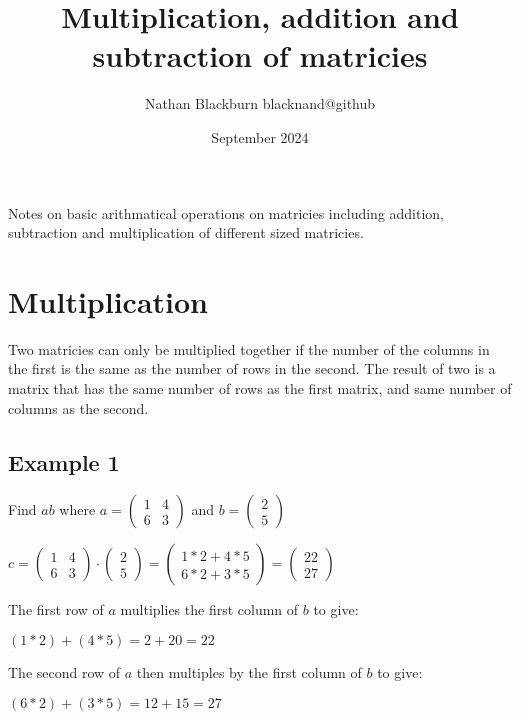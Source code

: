 \documentclass[options]{article}
\title{Multiplication, addition and subtraction of matricies}
\author{Nathan Blackburn {blacknand@github}}
\date{September 2024}
\begin{document}
\maketitle
Notes on basic arithmatical operations on matricies including addition, subtraction and multiplication of different sized matricies.
\section{Multiplication}
Two matricies can only be multiplied together if the number of the columns in the first is the same as the number of rows in the second. The
result of two is a matrix that has the same number of rows as the first matrix, and same number of columns as the second.
\subsection{Example 1}
Find \(ab\) where \(a = \begin{pmatrix} 1 & 4\\6 & 3 \end{pmatrix}\) and \(b = \begin{pmatrix} 2 \\ 5 \end{pmatrix}\)
\begin{center}
    \( 
        c =
        \begin{pmatrix}
            1 & 4 \\ 6 & 3
        \end{pmatrix} 
        \cdot
        \begin{pmatrix}
            2 \\ 5
        \end{pmatrix}
        =
        \begin{pmatrix}
            1 * 2 + 4 * 5\\
            6 * 2 + 3 * 5
        \end{pmatrix}
        =
        \begin{pmatrix}
            22 \\ 27
        \end{pmatrix}
    \)
\end{center}
The first row of \(a\) multiplies the first column of \(b\) to give:
\begin{center}
    \(
        (1 * 2) + (4 * 5) = 2 + 20 = 22
    \)
\end{center}
The second row of \(a\) then multiples by the first column of \(b\) to give:
\begin{center}
    \(
        (6 * 2) + (3 * 5) = 12 + 15 = 27
    \)
\end{center}
\end{document}
